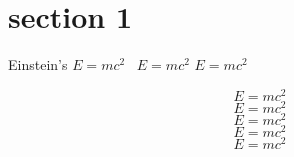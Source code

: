 \documentclass[12pt]{article}
\begin{document}
    \section{section 1}
    
    Einstein's $E=mc^2$ \ \(E=mc^2\)    
    \begin{math}
        E=mc^2
    \end{math}
    
    \[E=mc^2\] $$E=mc^2$$ %
    \begin{displaymath}
        E=mc^2
    \end{displaymath}
    \begin{equation*}   
        E=mc^2
    \end{equation*}
    \begin{equation} 
        \boxed{E=mc^2}  %
    \end{equation}
     
\end{document}
